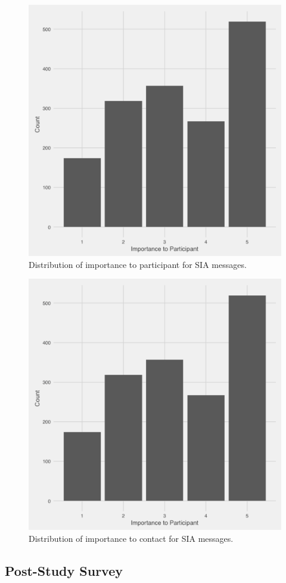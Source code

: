 \documentclass[12pt]{nuthesis}	%
\begin{document}
\begin{figure}[h]
\centering
\includegraphics[width=.7\textwidth]{figures/importance_distribution}
\caption{Distribution of importance to participant for SIA messages.}
\label{fig:importance_distribution}
\end{figure}

\begin{figure}[h]
\centering
\includegraphics[width=.7\textwidth]{figures/importance_distribution}
\caption{Distribution of importance to contact for SIA messages.}
\label{fig:importance_contact_distribution}
\end{figure}




\subsection{Post-Study Survey}
\end{document}
